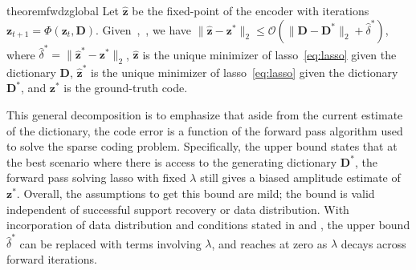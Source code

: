 \documentclass[10pt]{article} %
\newcommand{\D}{{\bm D}}
\newcommand{\z}{{\bm z}}
\begin{document}
%
\begin{restatable}{theorem}{fwdzglobal}\label{thm:fwdzglobal}
Let $\hat \z$ be the fixed-point of the encoder with iterations $\z_{t+1} = \Phi(\z_{t}, \D)$. Given~,~, we have $
\| \hat \z - \z^{\ast} \|_2  \leq \mathcal{O}(\| \D - \D^{\ast} \|_2 + \hat \delta^{\ast})$, where $\hat \delta^{\ast} = \| \hat \z^{\ast} - \z^{\ast} \|_2$, $\hat \z$ is the unique minimizer of lasso~\eqref{eq:lasso} given the dictionary $\D$,  $\hat \z^{\ast}$ is the unique minimizer of lasso~\eqref{eq:lasso} given the dictionary $\D^{\ast}$, and $\z^{\ast}$ is the ground-truth code.
\end{restatable}
%
This general decomposition is to emphasize that aside from the current estimate of the dictionary, the code error is a function of the forward pass algorithm used to solve the sparse coding problem. Specifically, the upper bound states that at the best scenario where there is access to the generating dictionary $\D^{\ast}$, the forward pass solving lasso with fixed $\lambda$ still gives a biased amplitude estimate of $\z^{\ast}$. Overall, the assumptions to get this bound are mild; the bound is valid independent of successful support recovery or data distribution. With incorporation of data distribution and conditions stated in  and , the upper bound $\hat \delta^{\ast}$ can be replaced with terms involving $\lambda$, and reaches at zero as $\lambda$ decays across forward iterations.
%
\end{document}
